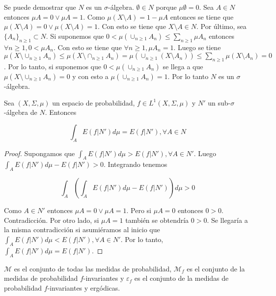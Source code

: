 Se puede demostrar que $N$ es un $\sigma$-álgebra. $\emptyset \in N$ porque $\mu \emptyset = 0$. Sea $A \in N$ entonces $\mu A = 0 \vee \mu A = 1$. Como $\mu(X \setminus A) = 1 - \mu A$ entonces se tiene que $\mu(X \setminus A) = 0 \vee \mu(X \setminus A) = 1$. Con esto se tiene que $X \setminus A \in N$. Por último, sea $\{A_n\}_{n \geq 1} \subset N$.  Si suponemos que $0 < \mu(\cup_{n \geq 1} A_n) \leq \sum_{n \geq 1} \mu A_n$ entonces $\forall n \geq 1, 0 < \mu A_n$. Con esto se tiene que $\forall n \geq 1, \mu A_n = 1$. Luego se tiene $\mu(X \setminus \cup_{n \geq 1} A_n) \leq \mu(X \setminus \cap_{n \geq 1} A_n) = \mu(\cup_{n \geq 1} (X \setminus A_n)) \leq \sum_{n \geq 1} \mu(X \setminus A_n) = 0$. Por lo tanto, si suponemos que $0 < \mu(\cup_{n \geq 1} A_n)$  se llega a que $\mu(X \setminus \cup_{n \geq 1} A_n) = 0$ y con esto a $\mu(\cup_{n \geq 1} A_n) = 1$. Por lo tanto $N$ es un $\sigma$-álgebra.

\begin{propiedad}\label{esperanza_en_sigma-algebra_trivial}
	Sea $(X,\Sigma,\mu)$ un espacio de probabilidad, $f \in L^1(X,\Sigma,\mu)$ y $N'$ un sub-$\sigma$-álgebra de $N$. Entonces
	
	\begin{equation}
		\int_A E(f|N') d\mu = E(f|N'), \forall A \in N
	\end{equation}
\end{propiedad}

\begin{proof}
	Supongamos que $\int_A E(f|N') d\mu > E(f|N'), \forall A \in N'$. Luego $\int_A E(f|N') d\mu - E(f|N') > 0$. Integrando tenemos
	
	\begin{equation}
		\int_A \left( \int_A E(f|N')d\mu - E(f|N') \right) d\mu > 0
	\end{equation}
	
	Como $A \in N'$ entonces $\mu A = 0 \vee \mu A = 1$. Pero si $\mu A = 0$ entonces $0>0$. Contradicción. Por otro lado, si $\mu A = 1$ también se obtendría $0>0$. Se llegaría a la misma contradicción si asumiéramos al inicio que $\int_A E(f|N') d\mu < E(f|N'), \forall A \in N'$. Por lo tanto, $\int_A E(f|N') d\mu = E(f|N')$.
\end{proof}

\begin{definicion}
	$\mathcal{M}$ es el conjunto de todas las medidas de probabilidad, $\mathcal{M}_f$ es el conjunto de la medidas de probabilidad $f$-invariantes y $\varepsilon_f$ es el conjunto de la medidas de probabilidad $f$-invariantes y ergódicas.
\end{definicion}

